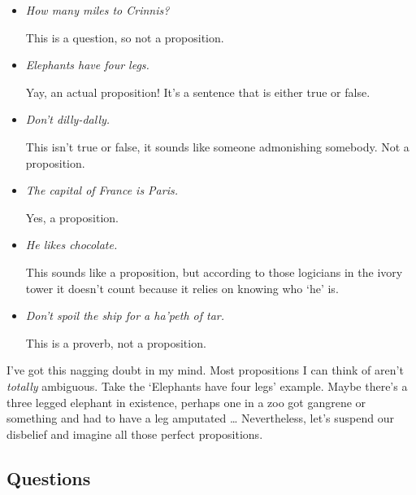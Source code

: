 \documentclass{article}
\begin{document}
    \begin{itemize}

      \item \emph{How many miles to Crinnis?}

        This is a question, so not a proposition.

      \item \emph{Elephants have four legs.}

        Yay, an actual proposition! It's a sentence that is either true or
        false.

      \item \emph{Don't dilly-dally.}

        This isn't true or false, it sounds like someone admonishing somebody.
        Not a proposition.

      \item \emph{The capital of France is Paris.}

        Yes, a proposition.

      \item \emph{He likes chocolate.}

        This sounds like a proposition, but according to those logicians in
        the ivory tower it doesn't count because it relies on knowing who `he'
        is.

      \item \emph{Don't spoil the ship for a ha'peth of tar.}

        This is a proverb, not a proposition.

    \end{itemize}

    I've got this nagging doubt in my mind. Most propositions I can think of
    aren't \emph{totally} ambiguous. Take the `Elephants have four legs'
    example. Maybe there's a three legged elephant in existence, perhaps one in
    a zoo got gangrene or something and had to have a leg amputated \ldots
    Nevertheless, let's suspend our disbelief and imagine all those perfect
    propositions.

    \subsection*{Questions}
\end{document}
